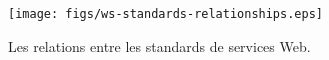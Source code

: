 \begin{figure}[h]
    \centering
    \texttt{[image: figs/ws-standards-relationships.eps]}
    \caption{Les relations entre les standards de services
      Web.~\cite{erl2004service}}
    \label{fig:ws-standards-relationships}
\end{figure}

